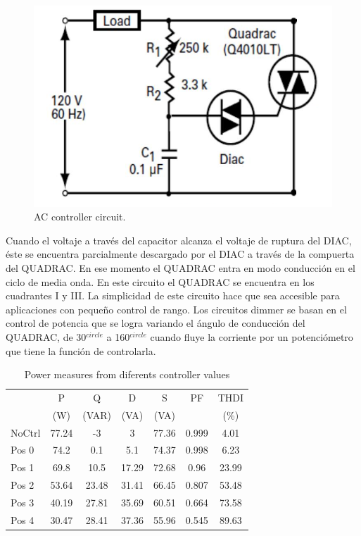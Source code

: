 \documentclass[journal]{IEEEtran}
\begin{document}
\begin{figure}[h]
\centering
\includegraphics[clip,width=\columnwidth]{controller.png}
\caption{AC controller circuit.}
\label{ACcontroller}
\end{figure}

Cuando el voltaje a través del capacitor alcanza el 
voltaje de ruptura del DIAC, éste se encuentra 
parcialmente descargado por el DIAC a través de la 
compuerta del QUADRAC. En ese momento el QUADRAC 
entra en modo conducción en el ciclo de media onda. 
En este circuito el QUADRAC se encuentra en los 
cuadrantes I y III. La simplicidad de este circuito 
hace que sea accesible para aplicaciones con pequeño 
control de rango. Los circuitos dimmer se basan en el 
control de potencia que se logra variando el ángulo de 
conducción del QUADRAC, de 30$^{circle}$ a 160$^{circle}$ 
cuando fluye la 
corriente por un potenciómetro que tiene la función de 
controlarla. \\

\begin{table}[h]
\begin{tabular}{|p{1.2cm}|c|c|c|c|c|c|}
\hline 
 & P  & Q  & D  & S  & PF & THDI  \\
 &(W) & (VAR) &(VA) & (VA) &  & (\%) \\ \hline  
NoCtrl & 77.24 & -3 & 3 & 77.36 & 0.999 & 4.01 \\ 
\hline 
Pos 0 & 74.2 & 0.1 & 5.1 & 74.37 & 0.998 & 6.23 \\ 
\hline 
Pos 1 & 69.8 & 10.5 & 17.29 & 72.68 & 0.96 & 23.99 \\
\hline 
Pos 2 & 53.64 & 23.48 & 31.41 & 66.45 & 0.807 & 53.48 \\
\hline 
Pos 3 & 40.19 & 27.81 & 35.69 & 60.51 & 0.664 & 73.58 \\ 
\hline
Pos 4 & 30.47 & 28.41 & 37.36 & 55.96 & 0.545 & 89.63 \\ 
\hline 
\end{tabular}
\caption{Power measures from diferents controller values}
\end{table}
\end{document}
